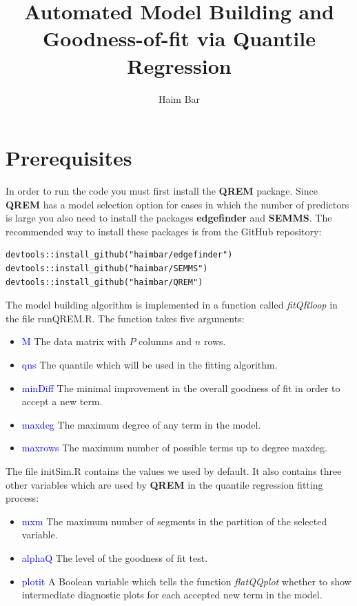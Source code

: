 \documentclass[a4paper,12pt]{article}
\title{Automated Model Building and Goodness-of-fit via Quantile Regression}
\author{Haim Bar}
\newcommand{\func}[1]{\textit{#1}}
\newcommand{\pkg}[1]{\textbf{#1}}
\begin{document}
\maketitle
{}

\section{Prerequisites}
In order to run the code you must first install the \pkg{QREM} package. Since \pkg{QREM} has a model selection option for cases in which the number of predictors is large you also need to install the packages \pkg{edgefinder} and \pkg{SEMMS}. The recommended way to install these packages is from the GitHub repository:

\begin{Verbatim}
devtools::install_github("haimbar/edgefinder")
devtools::install_github("haimbar/SEMMS")
devtools::install_github("haimbar/QREM")
\end{Verbatim}

The model building algorithm is implemented in a function called \func{fitQRloop} in the file runQREM.R. The function takes five arguments:
\begin{itemize}
 \item \textcolor{blue}{M} The data matrix with $P$ columns and $n$ rows.
 \item \textcolor{blue}{qns} The quantile which will be used in the fitting algorithm.
 \item \textcolor{blue}{minDiff} The minimal improvement in the overall goodness of fit in order to accept a new term.
 \item \textcolor{blue}{maxdeg} The maximum degree of any term in the model.
 \item \textcolor{blue}{maxrows} The maximum number of possible terms up to degree maxdeg.
\end{itemize}
The file initSim.R contains the values we used by default. It also contains three other variables which are used by \pkg{QREM} in the quantile regression fitting process:
\begin{itemize}
 \item \textcolor{blue}{mxm} The maximum number of segments in the partition of the selected variable.
 \item \textcolor{blue}{alphaQ} The level of the goodness of fit test.
 \item \textcolor{blue}{plotit} A Boolean variable which tells the function \func{flatQQplot} whether to show intermediate diagnostic plots for each accepted new term in the model.
\end{itemize}
\end{document}
